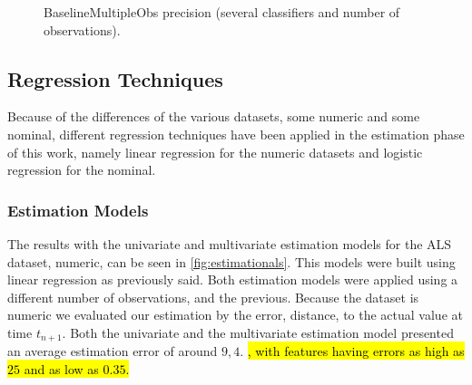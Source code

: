  \begin{figure}
  \begin{subfigmatrix}{2}
  \end{subfigmatrix}
  \caption{BaselineMultipleObs precision (several classifiers and number of observations).}
  \label{fig:baselinemulti}
\end{figure}



\subsection{Regression Techniques}
\label{subsection:regresion}

Because of the differences of the various datasets, some numeric and some nominal, different regression techniques have been applied
 in the estimation phase of this work, namely linear regression for the numeric datasets and logistic regression for the nominal.
  
\subsubsection{Estimation Models}
\label{subsubsection:estimation_regression}

The results with the univariate and multivariate estimation models for the ALS dataset, numeric, can be seen in 
\ref{fig:estimationals}. This models were built using linear regression
 as previously said. Both estimation models were applied using a different number of observations, and the previous.
 Because the dataset is numeric we evaluated our estimation by the error, distance, to the actual value at time $t_{n+1}$.
 Both the univariate and the multivariate estimation model presented an average estimation error of  around $9,4$. 
 \hl{, with features having errors as high as $25$ and as low as $0.35$.}
  
